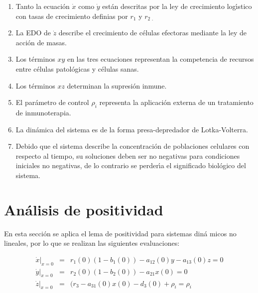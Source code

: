 \documentclass[letterpaper,11pt]{article}
\begin{document}
\begin{enumerate}
\item Tanto la ecuaci\'{o}n $\dot{x}$ como $\dot{y}$ est\'{a}n descritas por
la ley de crecimiento log\'{\i}stico con tasas de crecimiento definias por $%
r_{1}$ y $r_{2\text{ .}}$

\item La EDO de $\dot{z}$ describe el crecimiento de c\'{e}lulas efectoras
mediante la ley de acci\'{o}n de masas.

\item Los t\'{e}rminos $xy$ en las tres ecuaciones representan la
competencia de recursos entre c\'{e}lulas patol\'{o}gicas y c\'{e}lulas
sanas.

\item Los t\'{e}rminos $xz$ determinan la supresi\'{o}n inmune.

\item El par\'{a}metro de control $\rho _{i}$ representa la aplicaci\'{o}n
externa de un tratamiento de inmunoterapia.

\item La din\'{a}mica del sistema es de la forma presa-depredador de
Lotka-Volterra.

\item Debido que el sistema describe la concentraci\'{o}n de poblaciones
celulares con respecto al tiempo, su soluciones deben ser no negativas para
condiciones iniciales no negativas, de lo contrario se perder\'{\i}a el
significado biol\'{o}gico del sistema.
\end{enumerate}

\section{An\'{a}lisis de positividad}

En esta secci\'{o}n se aplica el lema de positividad para sistemas din\'{a}%
micos no lineales, por lo que se realizan las siguientes evaluaciones:

\begin{eqnarray}
\left. \dot{x}\right\vert _{x=0} &=&r_{1}(0)(1-b_{1}\left( 0\right)
)-a_{12}\left( 0\right) y-a_{13}\left( 0\right) z=0  \label{dx} \\
\left. \dot{y}\right\vert _{x=0} &=&r_{2}(0)(1-b_{2}\left( 0\right)
)-a_{21}x\left( 0\right) =0  \label{dy} \\
\left. \dot{z}\right\vert _{x=0} &=&(r_{3}-a_{31}\left( 0\right) x\left(
0\right) -d_{3}\left( 0\right) +\rho _{i}=\rho _{i}  \label{dz}
\end{eqnarray}
\end{document}
